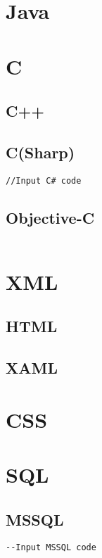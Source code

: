 








\newpage
\section{Java}
\newpage
\section{C}
\newpage
\subsection{C++}
\newpage
\subsection{C(Sharp)}
\begin{lstlisting}[style = CSharp]
//Input C# code
\end{lstlisting}
\newpage
\subsection{Objective-C}
\begin{lstlisting}

\end{lstlisting}
\newpage
\section{XML}
\newpage
\subsection{HTML}
\newpage
\subsection{XAML}
\newpage
\section{CSS}
\newpage
\section{SQL}
\subsection{MSSQL}
\begin{lstlisting}[style = MSSQL]
--Input MSSQL code
\end{lstlisting}
